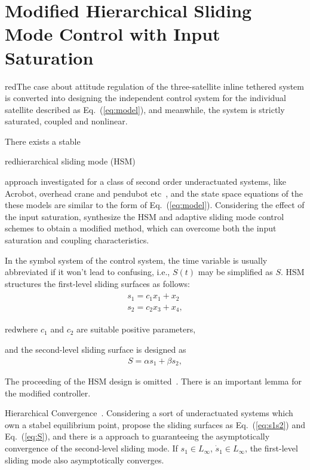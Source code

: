 \section{Modified Hierarchical Sliding Mode Control with Input Saturation}\label{sec:SMC}
\begin{color}{red}The case about attitude regulation of the three-satellite inline tethered system is converted into designing the independent control system for the individual satellite described as Eq.~(\ref{eq:model}), and meanwhile, the system is strictly saturated, coupled and nonlinear.\end{color} There exists a stable \begin{color}{red}hierarchical sliding mode (HSM)\end{color} approach investigated for a class of second order underactuated systems, like Acrobot, overhead crane and pendubot etc~\cite{wang2004design}, and the state space equations of the these models are similar to the form of Eq.~(\ref{eq:model}). Considering the effect of the input saturation, synthesize the HSM and adaptive sliding mode control schemes to obtain a modified method, which can overcome both the input saturation and coupling characteristics.\par
In the symbol system of the control system, the time variable is usually abbreviated if it won't lead to confusing, i.e., $S(t)$ may be simplified as $S$. HSM structures the first-level sliding surfaces as follows:
\begin{align}
\begin{split}
s_1 = c_1x_1+x_2\\
s_2 = c_2x_3+x_4,
\end{split}\label{eq:s1s2}
\end{align}
\begin{color}{red}where $c_1$ and $c_2$ are suitable positive parameters,\end{color} and the second-level sliding surface is designed as
\begin{align}
S=\alpha s_1+\beta s_2\label{eq:S},
\end{align}\par
The proceeding of the HSM design is omitted~\cite{wang2004design}. There is an important lemma for the modified controller.
\begin{lemma}Hierarchical Convergence~\cite{wang2004design}.
Considering a sort of underactuated systems which own a stabel equilibrium point, propose the sliding surfaces as Eq.~(\ref{eq:s1s2}) and Eq.~(\ref{eq:S}), and there is a approach to guaranteeing the asymptotically convergence of the second-level sliding mode. If $s_1\in L_\infty$, $\dot s_1\in L_\infty$, the first-level sliding mode also asymptotically converges.\label{lm:1}
\end{lemma}\par
